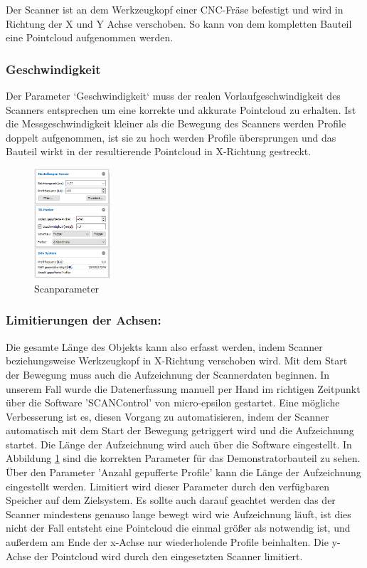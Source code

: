 \documentclass[../main.tex]{subfiles}
\begin{document}
Der Scanner ist an dem Werkzeugkopf einer CNC-Fräse befestigt und wird 
in Richtung der X und Y Achse verschoben. So kann von dem kompletten Bauteil eine 
Pointcloud aufgenommen werden.

\subsubsection{Geschwindigkeit}
Der Parameter `Geschwindigkeit` muss der realen Vorlaufgeschwindigkeit des Scanners
entsprechen um eine korrekte und akkurate Pointcloud zu erhalten. Ist die 
Messgeschwindigkeit kleiner als die Bewegung des Scanners werden Profile doppelt 
aufgenommen, ist sie zu hoch werden Profile übersprungen und das Bauteil wirkt in 
der resultierende Pointcloud in X-Richtung gestreckt.

\newpage

\begin{figure}
    \includegraphics[width=0.25\textwidth]{images/Parameter_Scan.png}
    \caption{Scanparameter}
    \label{fig:scanparameter}
\end{figure}

\subsubsection{Limitierungen der Achsen:}

Die gesamte Länge des Objekts kann also erfasst werden, indem Scanner 
beziehungsweise Werkzeugkopf in X-Richtung verschoben wird. Mit dem Start der 
Bewegung muss auch die Aufzeichnung der Scannerdaten beginnen. In unserem Fall wurde
die Datenerfassung manuell per Hand im richtigen Zeitpunkt über die Software 
'SCANControl' von micro-epsilon gestartet. 
Eine mögliche Verbesserung ist es, diesen Vorgang zu automatisieren, indem der 
Scanner automatisch mit dem Start der Bewegung getriggert wird und die Aufzeichnung
startet. Die Länge der Aufzeichnung wird auch über die Software eingestellt. 
In Abbildung \ref{fig:scanparameter} sind die korrekten Parameter für das 
Demonstratorbauteil zu sehen. Über den Parameter 'Anzahl gepufferte Profile' kann 
die Länge der Aufzeichnung eingestellt werden. Limitiert wird dieser Parameter 
durch den verfügbaren Speicher auf dem Zielsystem. Es sollte auch darauf geachtet 
werden das der Scanner mindestens genauso lange bewegt wird wie Aufzeichnung läuft, 
ist dies nicht der Fall entsteht eine Pointcloud die einmal größer als notwendig ist, 
und außerdem am Ende der x-Achse nur wiederholende Profile beinhalten. 
Die y-Achse der Pointcloud wird durch den eingesetzten Scanner limitiert. 
\end{document}
